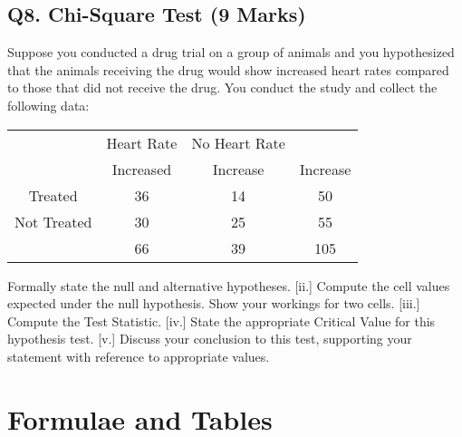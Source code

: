 \subsection*{Q8. Chi-Square Test (9 Marks)} %
Suppose you conducted a drug trial on a group of animals and you hypothesized that the animals receiving the drug would show increased heart rates compared to those that did not receive the drug. You conduct the study and collect the following data:
{
	\large
\begin{center}
\begin{tabular}{|c|c|c|c|}
	\hline  & Heart Rate & No Heart Rate  &  \\  
	  & Increased & Increase & Increase \\ 
	\hline Treated  & 36 & 14 & 50 \\ 
	\hline Not Treated & 30 & 25 & 55 \\ 
	\hline  & 66 & 39 & 105 \\ 
	\hline 
\end{tabular} 
\end{center}
}
\begin{itemize}
[i.] Formally state the null and alternative hypotheses.
[ii.]  Compute the cell values expected under the null hypothesis. Show your workings for two cells.
[iii.] Compute the Test Statistic.
[iv.] State the appropriate Critical Value for this hypothesis test.
[v.] Discuss your conclusion to this test, supporting your statement with reference to appropriate values.
\end{itemize}

%

\newpage


\section*{Formulae and Tables}
